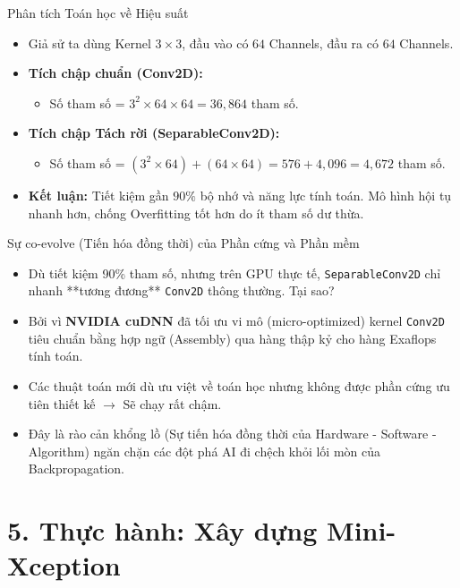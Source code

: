 \documentclass[aspectratio=169]{beamer}
\begin{document}
\begin{frame}{Phân tích Toán học về Hiệu suất}
    \begin{itemize}
        \item Giả sử ta dùng Kernel $3 \times 3$, đầu vào có $64$ Channels, đầu ra có $64$ Channels.
        \item \textbf{Tích chập chuẩn (Conv2D):}
        \begin{itemize}
            \item Số tham số = $3^2 \times 64 \times 64 = 36,864$ tham số.
        \end{itemize}
        \item \textbf{Tích chập Tách rời (SeparableConv2D):}
        \begin{itemize}
            \item Số tham số = $(3^2 \times 64) + (64 \times 64) = 576 + 4,096 = 4,672$ tham số.
        \end{itemize}
        \item \textbf{Kết luận:} Tiết kiệm gần $90\%$ bộ nhớ và năng lực tính toán. Mô hình hội tụ nhanh hơn, chống Overfitting tốt hơn do ít tham số dư thừa.
    \end{itemize}
\end{frame}

\begin{frame}{Sự co-evolve (Tiến hóa đồng thời) của Phần cứng và Phần mềm}
    \begin{itemize}
        \item Dù tiết kiệm 90\% tham số, nhưng trên GPU thực tế, \texttt{SeparableConv2D} chỉ nhanh **tương đương** \texttt{Conv2D} thông thường. Tại sao?
        \item Bởi vì \textbf{NVIDIA cuDNN} đã tối ưu vi mô (micro-optimized) kernel \texttt{Conv2D} tiêu chuẩn bằng hợp ngữ (Assembly) qua hàng thập kỷ cho hàng Exaflops tính toán.
        \item Các thuật toán mới dù ưu việt về toán học nhưng không được phần cứng ưu tiên thiết kế $\rightarrow$ Sẽ chạy rất chậm.
        \item Đây là rào cản khổng lồ (Sự tiến hóa đồng thời của Hardware - Software - Algorithm) ngăn chặn các đột phá AI đi chệch khỏi lối mòn của Backpropagation.
    \end{itemize}
\end{frame}

\section{5. Thực hành: Xây dựng Mini-Xception}
\end{document}
